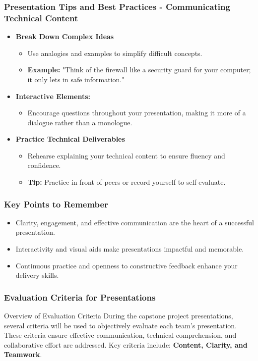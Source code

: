 \documentclass[aspectratio=169]{beamer}
\begin{document}
\begin{frame}[fragile]
    \frametitle{Presentation Tips and Best Practices - Communicating Technical Content}
    \begin{itemize}
        \item \textbf{Break Down Complex Ideas}
        \begin{itemize}
            \item Use analogies and examples to simplify difficult concepts.
            \item \textbf{Example:} "Think of the firewall like a security guard for your computer; it only lets in safe information."
        \end{itemize}

        \item \textbf{Interactive Elements:} 
        \begin{itemize}
            \item Encourage questions throughout your presentation, making it more of a dialogue rather than a monologue.
        \end{itemize}

        \item \textbf{Practice Technical Deliverables}
        \begin{itemize}
            \item Rehearse explaining your technical content to ensure fluency and confidence.
            \item \textbf{Tip:} Practice in front of peers or record yourself to self-evaluate.
        \end{itemize}
    \end{itemize}
\end{frame}

\begin{frame}[fragile]
    \frametitle{Key Points to Remember}
    \begin{itemize}
        \item Clarity, engagement, and effective communication are the heart of a successful presentation.
        \item Interactivity and visual aids make presentations impactful and memorable.
        \item Continuous practice and openness to constructive feedback enhance your delivery skills.
    \end{itemize}
\end{frame}

\begin{frame}[fragile]
  \frametitle{Evaluation Criteria for Presentations}
  \begin{block}{Overview of Evaluation Criteria}
    During the capstone project presentations, several criteria will be used to objectively evaluate each team's presentation. 
    These criteria ensure effective communication, technical comprehension, and collaborative effort are addressed.
    Key criteria include: \textbf{Content, Clarity, and Teamwork}.
  \end{block}
\end{frame}
\end{document}
